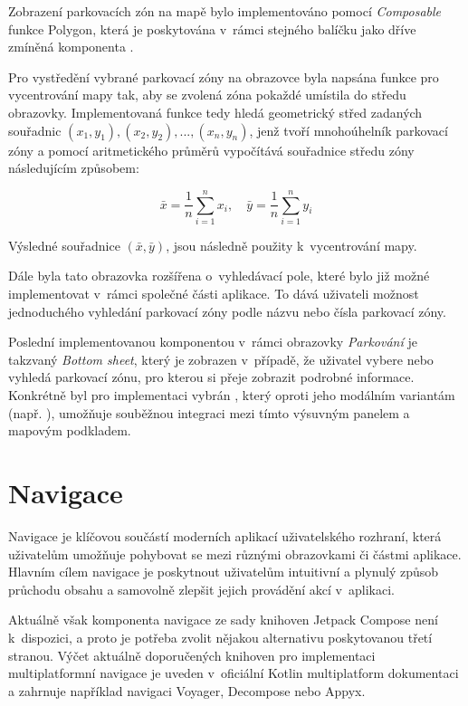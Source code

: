 Zobrazení parkovacích zón na mapě bylo implementováno pomocí \textit{Composable} funkce Polygon, která je poskytována v~rámci stejného balíčku 
jako dříve zmíněná komponenta .

Pro vystředění vybrané parkovací zóny na obrazovce byla napsána funkce pro vycentrování mapy tak, aby se zvolená zóna pokaždé 
umístila do středu obrazovky. Implementovaná funkce tedy hledá geometrický střed zadaných souřadnic \( (x_1, y_1), (x_2, y_2), ..., (x_n, y_n)\), 
jenž tvoří mnohoúhelník parkovací zóny a pomocí aritmetického průměrů vypočítává souřadnice středu zóny následujícím způsobem:

\[
\bar{x} = \frac{1}{n} \sum_{i=1}^{n} x_i, \quad \bar{y} = \frac{1}{n} \sum_{i=1}^{n} y_i
\]

Výsledné souřadnice $(\bar{x},\bar{y})$, jsou následně použity k~vycentrování mapy.

\bigskip

Dále byla tato obrazovka rozšířena o~vyhledávací pole, které bylo již možné implementovat v~rámci společné části aplikace. 
To dává uživateli možnost jednoduchého vyhledání parkovací zóny podle názvu nebo čísla parkovací zóny.

Poslední implementovanou komponentou v~rámci obrazovky \textit{Parkování} je takzvaný \textit{Bottom sheet}, který je zobrazen v~případě, 
že uživatel vybere nebo vyhledá parkovací zónu, pro kterou si přeje zobrazit podrobné informace. Konkrétně byl pro implementaci vybrán 
, který oproti jeho modálním variantám (např. ), umožňuje souběžnou integraci mezi tímto
 výsuvným panelem a mapovým podkladem.


\section{Navigace}
Navigace je klíčovou součástí moderních aplikací uživatelského rozhraní, která uživatelům umožňuje pohybovat se mezi různými obrazovkami či 
částmi aplikace. Hlavním cílem navigace je poskytnout uživatelům intuitivní a plynulý způsob průchodu obsahu a samovolně zlepšit jejich provádění akcí v~aplikaci. 

\medskip

Aktuálně však komponenta navigace ze sady knihoven Jetpack Compose není k~dispozici, a proto je potřeba zvolit nějakou alternativu poskytovanou
třetí stranou. \cite{composeNav} Výčet aktuálně doporučených knihoven pro implementaci multiplatformní navigace je uveden v~oficiální Kotlin 
multiplatform dokumentaci a zahrnuje například navigaci Voyager, Decompose nebo Appyx. 

